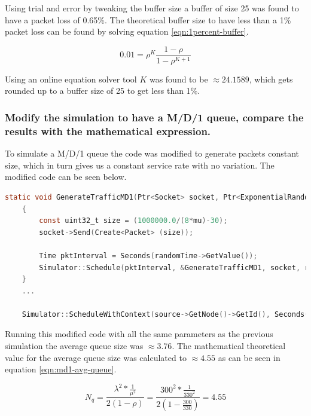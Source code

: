 \documentclass{article}
\begin{document}
    Using trial and error by tweaking the buffer size a buffer of size 25 was found to have a packet loss of 0.65\%. The theoretical buffer size to have less than a 1\% packet loss can be found by solving equation \ref{eqn:1percent-buffer}.

    \begin{equation}
    \label{eqn:1percent-buffer}
        0.01 = \rho^K\frac{1-\rho}{1-\rho^{K+1}}
    \end{equation}

    Using an online equation solver tool \cite{wolfram} $K$ was found to be $\approx24.1589$, which gets rounded up to a buffer size of 25 to get less than 1\%.

    \subsubsection*{Modify the simulation to have a M/D/1 queue, compare the results with the mathematical expression.}
    To simulate a M/D/1 queue the code was modified to generate packets constant size, which in turn gives us a constant service rate with no variation. The modified code can be seen below. 

    \begin{lstlisting}[language=C]
    static void GenerateTrafficMD1(Ptr<Socket> socket, Ptr<ExponentialRandomVariable> randomTime, double mu) 
    {
        const uint32_t size = (1000000.0/(8*mu)-30);
        socket->Send(Create<Packet> (size));
    
        Time pktInterval = Seconds(randomTime->GetValue());
        Simulator::Schedule(pktInterval, &GenerateTrafficMD1, socket, randomTime, mu);
    }
    ...    

    Simulator::ScheduleWithContext(source->GetNode()->GetId(), Seconds(1.0), &GenerateTrafficMD1, source, randomTime, mu);
    \end{lstlisting}

    Running this modified code with all the same parameters as the previous simulation the average queue size was $\approx3.76$. The mathematical theoretical value for the average queue size was calculated to $\approx4.55$ as can be seen in equation \ref{eqn:md1-avg-queue}.

    \begin{equation}
    \label{eqn:md1-avg-queue}
        N_q = \frac{\lambda^2*\frac{1}{\mu^2}}{2(1-\rho)} = \frac{300^2*\frac{1}{330^2}}{2\left(1-\frac{300}{330}\right)} = 4.55
    \end{equation}

    

    \newpage
    \printbibliography
\end{document}
